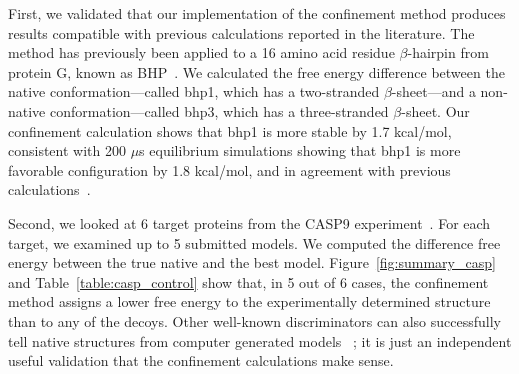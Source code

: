 \documentclass[12pt]{article}
\begin{document}
First, we validated that our implementation of the confinement method produces results compatible with previous
calculations reported in the literature.  The method has previously been applied to a 16 amino acid residue
$\beta$-hairpin from protein G, known as BHP~\cite{Cecchini2009}. We calculated the free energy difference between the
native conformation---called bhp1, which has a two-stranded $\beta$-sheet---and a non-native conformation---called bhp3,
which has a three-stranded $\beta$-sheet. Our confinement calculation shows that bhp1 is more stable by 1.7 kcal/mol,
consistent with 200 $\mu$s equilibrium simulations showing that bhp1 is more favorable configuration by 1.8 kcal/mol, and
in agreement with previous calculations~\cite{Cecchini2009}.

Second, we looked at 6 target proteins from the CASP9 experiment~\cite{Moult2011}.  For each target, we examined up to 5 submitted
models.  We computed the difference free energy between the true native and the best model.
Figure~\ref{fig:summary_casp} and Table~\ref{table:casp_control} show that, in 5 out of 6 cases, the confinement method
assigns a lower free energy to the experimentally determined structure than to any of the decoys.  Other well-known
discriminators can also successfully tell native structures from computer generated models~\cite{Sheffler2009,Zhou2002} 
; it is just an independent useful validation that the confinement calculations make
sense.
\end{document}
